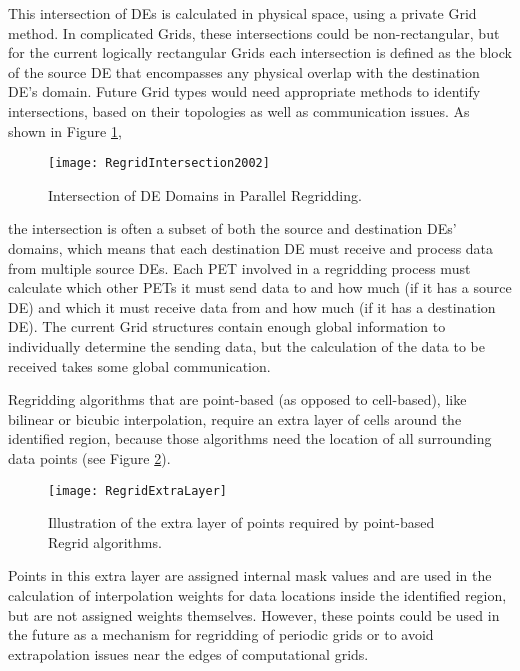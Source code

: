 This intersection of DEs is calculated in physical space, using a private Grid
method.  In complicated Grids, these intersections could be non-rectangular, but
for the current logically rectangular Grids each intersection is defined as the
block of the source DE that encompasses any physical overlap with the destination
DE's domain.  Future Grid types would need appropriate methods to identify
intersections, based on their topologies as well as communication issues.  As
shown in Figure \ref{fig:RegridIntersection}, 

\begin{center}
\begin{figure}
\caption{Intersection of DE Domains in Parallel Regridding. }
\label{fig:RegridIntersection}
\resizebox{\textwidth}{!}
  {\texttt{[image: RegridIntersection2002]}}
\end{figure}
\end{center}

the intersection is often a subset of both the source and destination DEs'
domains, which means that each destination DE must receive and process data from
multiple source DEs.  Each PET involved in a regridding process must calculate
which other PETs it must send data to and how much (if it has a source DE) and
which it must receive data from and how much (if it has a destination DE).  The
current Grid structures contain enough global information to individually
determine the sending data, but the calculation of the data to be received takes
some global communication.

Regridding algorithms that are point-based (as opposed to cell-based), like
bilinear or bicubic interpolation, require an extra layer of cells around the
identified region, because those algorithms need the location of all surrounding
data points (see Figure \ref{fig:RegridExtraLayer}).

\begin{center}
\begin{figure} 
\caption{Illustration of the extra layer of points required by point-based Regrid
         algorithms. }
\label{fig:RegridExtraLayer}
\resizebox{\textwidth}{!}
  {\texttt{[image: RegridExtraLayer]}}
\end{figure}
\end{center}

Points in this extra layer are assigned internal mask values and are used in the
calculation of interpolation weights for data locations inside the identified
region, but are not assigned weights themselves.  However, these points could be
used in the future as a mechanism for regridding of periodic grids or to avoid
extrapolation issues near the edges of computational grids.

